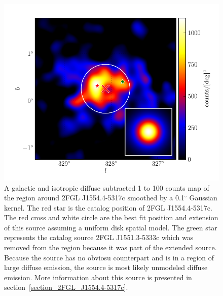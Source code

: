 \documentclass[12pt,preprint]{aastex}
\newcommand{\gev}{\text{GeV}\xspace}
\renewcommand{\deg}{\ensuremath{^\circ}\xspace}
\begin{document}
\begin{figure}
  \begin{center}
    \includegraphics[type=pdf,ext=.pdf,read=.pdf]{source_plots/source_1FGL_J1554.0-5345c}
  \end{center}
  \caption{
  A galactic and isotropic diffuse subtracted 1 \gev to 100 \gev
  counts map of the region around 2FGL J1554.4-5317c smoothed by a
  0.1\deg Gaussian kernel.  The red star is the catalog position of
  2FGL J1554.4-5317c.  The red cross and white circle are the best
  fit position and extension of this source assuming a uniform disk
  spatial model.  The green star represents the catalog source 2FGL
  J1551.3-5333c which was removed from the region because it was part of
  the extended source.  Because the source has no obviosu counterpart and
  is in a region of large diffuse emission, the source is most likely
  unmodeled diffuse emission.  More information about this source is
  presented in section~\ref{section_2FGL_J1554.4-5317c}.
  }
  \label{1FGL_J1554.0-5345c}
\end{figure}
\end{document}
